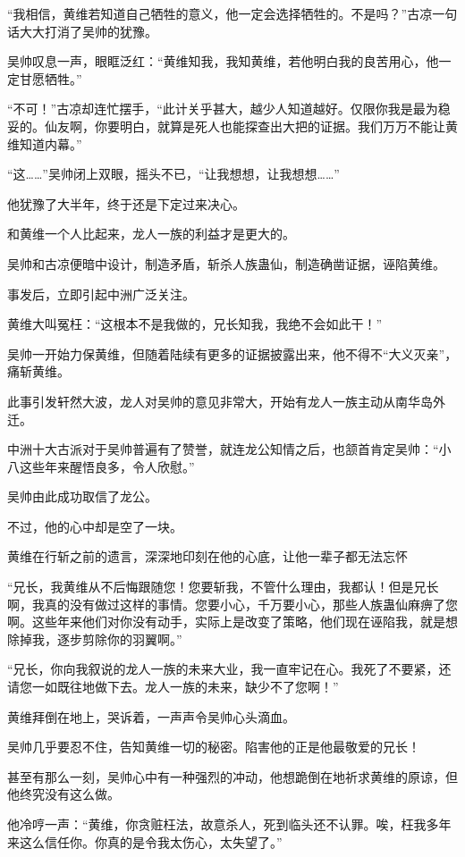 \begin{this_body}
“我相信，黄维若知道自己牺牲的意义，他一定会选择牺牲的。不是吗？”古凉一句话大大打消了吴帅的犹豫。

吴帅叹息一声，眼眶泛红：“黄维知我，我知黄维，若他明白我的良苦用心，他一定甘愿牺牲。”

“不可！”古凉却连忙摆手，“此计关乎甚大，越少人知道越好。仅限你我是最为稳妥的。仙友啊，你要明白，就算是死人也能探查出大把的证据。我们万万不能让黄维知道内幕。”

“这……”吴帅闭上双眼，摇头不已，“让我想想，让我想想……”

他犹豫了大半年，终于还是下定过来决心。

和黄维一个人比起来，龙人一族的利益才是更大的。

吴帅和古凉便暗中设计，制造矛盾，斩杀人族蛊仙，制造确凿证据，诬陷黄维。

事发后，立即引起中洲广泛关注。

黄维大叫冤枉：“这根本不是我做的，兄长知我，我绝不会如此干！”

吴帅一开始力保黄维，但随着陆续有更多的证据披露出来，他不得不“大义灭亲”，痛斩黄维。

此事引发轩然大波，龙人对吴帅的意见非常大，开始有龙人一族主动从南华岛外迁。

中洲十大古派对于吴帅普遍有了赞誉，就连龙公知情之后，也颔首肯定吴帅：“小八这些年来醒悟良多，令人欣慰。”

吴帅由此成功取信了龙公。

不过，他的心中却是空了一块。

黄维在行斩之前的遗言，深深地印刻在他的心底，让他一辈子都无法忘怀

“兄长，我黄维从不后悔跟随您！您要斩我，不管什么理由，我都认！但是兄长啊，我真的没有做过这样的事情。您要小心，千万要小心，那些人族蛊仙麻痹了您啊。这些年来他们对你没有动手，实际上是改变了策略，他们现在诬陷我，就是想除掉我，逐步剪除你的羽翼啊。”

“兄长，你向我叙说的龙人一族的未来大业，我一直牢记在心。我死了不要紧，还请您一如既往地做下去。龙人一族的未来，缺少不了您啊！”

黄维拜倒在地上，哭诉着，一声声令吴帅心头滴血。

吴帅几乎要忍不住，告知黄维一切的秘密。陷害他的正是他最敬爱的兄长！

甚至有那么一刻，吴帅心中有一种强烈的冲动，他想跪倒在地祈求黄维的原谅，但他终究没有这么做。

他冷哼一声：“黄维，你贪赃枉法，故意杀人，死到临头还不认罪。唉，枉我多年来这么信任你。你真的是令我太伤心，太失望了。”


\end{this_body}
